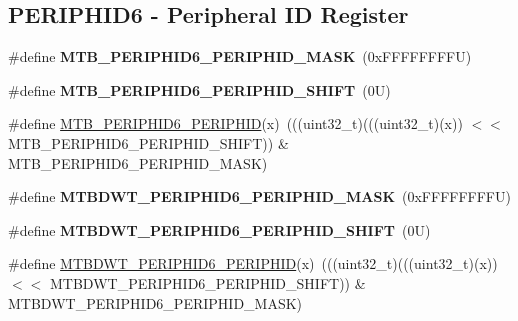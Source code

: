 \subsection*{P\+E\+R\+I\+P\+H\+I\+D6 -\/ Peripheral ID Register}
\begin{DoxyCompactItemize}
\item 
\mbox{\label{group___m_t_b___register___masks_ga7965ab09b2fe60eb9b771e449cd7466c}} 
\#define {\bfseries M\+T\+B\+\_\+\+P\+E\+R\+I\+P\+H\+I\+D6\+\_\+\+P\+E\+R\+I\+P\+H\+I\+D\+\_\+\+M\+A\+SK}~(0x\+F\+F\+F\+F\+F\+F\+F\+F\+U)
\item 
\mbox{\label{group___m_t_b___register___masks_ga34767325aea0f8963dedfaf4dc2da469}} 
\#define {\bfseries M\+T\+B\+\_\+\+P\+E\+R\+I\+P\+H\+I\+D6\+\_\+\+P\+E\+R\+I\+P\+H\+I\+D\+\_\+\+S\+H\+I\+FT}~(0\+U)
\item 
\#define \mbox{\hyperlink{group___m_t_b___register___masks_ga6ccb4c04c2251fee8200622a034a9d04}{M\+T\+B\+\_\+\+P\+E\+R\+I\+P\+H\+I\+D6\+\_\+\+P\+E\+R\+I\+P\+H\+ID}}(x)~(((uint32\+\_\+t)(((uint32\+\_\+t)(x)) $<$$<$ M\+T\+B\+\_\+\+P\+E\+R\+I\+P\+H\+I\+D6\+\_\+\+P\+E\+R\+I\+P\+H\+I\+D\+\_\+\+S\+H\+I\+FT)) \& M\+T\+B\+\_\+\+P\+E\+R\+I\+P\+H\+I\+D6\+\_\+\+P\+E\+R\+I\+P\+H\+I\+D\+\_\+\+M\+A\+SK)
\item 
\mbox{\label{group___m_t_b___register___masks_gadc45ad91346a567902451afe445949a0}} 
\#define {\bfseries M\+T\+B\+D\+W\+T\+\_\+\+P\+E\+R\+I\+P\+H\+I\+D6\+\_\+\+P\+E\+R\+I\+P\+H\+I\+D\+\_\+\+M\+A\+SK}~(0x\+F\+F\+F\+F\+F\+F\+F\+F\+U)
\item 
\mbox{\label{group___m_t_b___register___masks_gaefb0c9e8c3e0ae087571adc2a087a670}} 
\#define {\bfseries M\+T\+B\+D\+W\+T\+\_\+\+P\+E\+R\+I\+P\+H\+I\+D6\+\_\+\+P\+E\+R\+I\+P\+H\+I\+D\+\_\+\+S\+H\+I\+FT}~(0\+U)
\item 
\#define \mbox{\hyperlink{group___m_t_b___register___masks_ga74cfcb5a32e50f288fee821949807eda}{M\+T\+B\+D\+W\+T\+\_\+\+P\+E\+R\+I\+P\+H\+I\+D6\+\_\+\+P\+E\+R\+I\+P\+H\+ID}}(x)~(((uint32\+\_\+t)(((uint32\+\_\+t)(x)) $<$$<$ M\+T\+B\+D\+W\+T\+\_\+\+P\+E\+R\+I\+P\+H\+I\+D6\+\_\+\+P\+E\+R\+I\+P\+H\+I\+D\+\_\+\+S\+H\+I\+FT)) \& M\+T\+B\+D\+W\+T\+\_\+\+P\+E\+R\+I\+P\+H\+I\+D6\+\_\+\+P\+E\+R\+I\+P\+H\+I\+D\+\_\+\+M\+A\+SK)
\item 

\end{DoxyCompactItemize}
